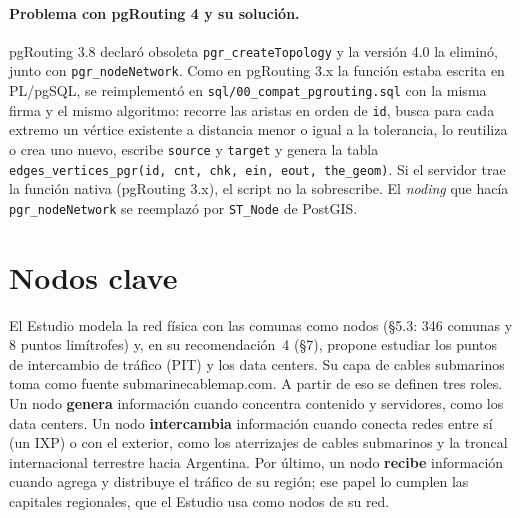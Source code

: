 \documentclass[11pt,a4paper]{article}
\newcommand{\cod}[1]{\texttt{#1}}
\begin{document}
\paragraph{Problema con pgRouting 4 y su solución.} pgRouting 3.8 declaró obsoleta
\cod{pgr\_createTopology} y la versión 4.0 la eliminó, junto con \cod{pgr\_nodeNetwork}. Como en
pgRouting 3.x la función estaba escrita en PL/pgSQL, se reimplementó en
\cod{sql/00\_compat\_pgrouting.sql} con la misma firma y el mismo algoritmo: recorre las aristas en
orden de \cod{id}, busca para cada extremo un vértice existente a distancia menor o igual a la
tolerancia, lo reutiliza o crea uno nuevo, escribe \cod{source} y \cod{target} y genera la tabla
\cod{edges\_vertices\_pgr(id, cnt, chk, ein, eout, the\_geom)}. Si el servidor trae la función
nativa (pgRouting 3.x), el script no la sobrescribe. El \emph{noding} que hacía
\cod{pgr\_nodeNetwork} se reemplazó por \cod{ST\_Node} de PostGIS.

\section{Nodos clave}
El Estudio modela la red física con las comunas como nodos (§5.3: 346 comunas y 8 puntos limítrofes)
y, en su recomendación~4 (§7), propone estudiar los puntos de intercambio de tráfico (PIT) y los data
centers. Su capa de cables submarinos toma como fuente submarinecablemap.com. A partir de eso se
definen tres roles. Un nodo \textbf{genera} información cuando concentra contenido y servidores, como
los data centers. Un nodo \textbf{intercambia} información cuando conecta redes entre sí (un IXP) o con
el exterior, como los aterrizajes de cables submarinos y la troncal internacional terrestre hacia
Argentina. Por último, un nodo \textbf{recibe} información cuando agrega y distribuye el tráfico de su
región; ese papel lo cumplen las capitales regionales, que el Estudio usa como nodos de su red.
\end{document}
